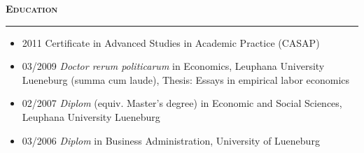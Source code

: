 \documentclass[10pt,pdftex,a4paper,oneside]{article}
\begin{document}
\textbf{\textsc{Education}}
\vspace{.5ex}
\hrule
\begin{itemize}[noitemsep,nolistsep]
\item[]2011 Certificate in Advanced Studies in Academic Practice (CASAP)
\item[]03/2009 \emph{Doctor rerum politicarum} in Economics, Leuphana University Lueneburg (summa cum laude), Thesis: Essays in empirical labor economics
\item[]02/2007 \emph{Diplom} (equiv. Master's degree) in Economic and Social Sciences, Leuphana University Lueneburg 
\item[]03/2006 \emph{Diplom}  in Business Administration, University of Lueneburg
\end{itemize}

\newpage
\end{document}

